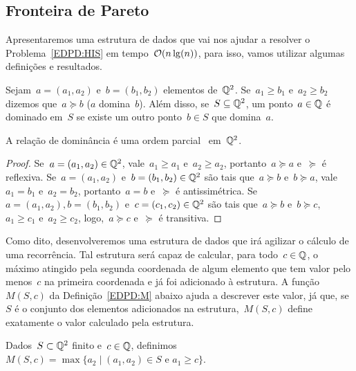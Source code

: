 
\subsection{Fronteira de Pareto}

Apresentaremos uma estrutura de dados que vai nos ajudar a resolver o Problema~\ref{EDPD:HIS} em tempo~$\mathcal{O}(n\lg(n))$, para isso, vamos utilizar algumas definições e resultados.

\begin{defi}
Sejam~${ a = (a_1,a_2) }$ e~${ b = (b_1,b_2) }$ elementos de~$\mathbb{Q}^2$. Se~${ a_1 \geq b_1 }$ e~${ a_2 \geq b_2 }$ dizemos que~${ a \succeq b }$ ($a$ domina~$b$). Além disso, se~${ S \subseteq \mathbb{Q}^2 }$, um ponto~${ a \in \mathbb{Q} }$ é dominado em~$S$ se existe um outro ponto~$b \in S$ que domina~$a$.
\end{defi}

\begin{prop}
A relação de dominância é uma ordem parcial~\cite[Apêndice B]{CLRS} em~$\mathbb{Q}^2$.
\end{prop}
\begin{proof}
Se~$a = (a_1,a_2) \in \mathbb{Q}^2$, vale~$a_1 \geq a_1$ e~$a_2 \geq a_2$, portanto~$a \succeq a$ e~$\succeq$ é reflexiva. Se~$a = (a_1,a_2)$ e~$b = (b_1,b_2) \in \mathbb{Q}^2$ são tais que~$a \succeq b$ e~$b \succeq a$, vale~$a_1 = b_1$ e~$a_2 = b_2$, portanto~$a = b$ e~$\succeq$ é antissimétrica. Se~$a = (a_1,a_2), b = (b_1,b_2)$ e~$c = (c_1,c_2) \in \mathbb{Q}^2$ são tais que~$a \succeq b$ e~$b \succeq c$,~$a_1 \geq c_1$ e~$a_2 \geq c_2$, logo,~$a \succeq c$ e~$\succeq$ é transitiva.
\end{proof}

Como dito, desenvolveremos uma estrutura de dados que irá agilizar o cálculo de uma recorrência. Tal estrutura será capaz de calcular, para todo~${ c \in \mathbb{Q} }$, o máximo atingido pela segunda coordenada de algum elemento que tem valor pelo menos~$c$ na primeira coordenada e já foi adicionado à estrutura. A função~$M(S,c)$ da Definição~\ref{EDPD:M} abaixo ajuda a descrever este valor, já que, se~$S$ é o conjunto dos elementos adicionados na estrutura,~$M(S,c)$ define exatamente o valor calculado pela estrutura.
\begin{defi} \label{EDPD:M}
Dados~$S \subset \mathbb{Q}^2$ finito e~$c \in \mathbb{Q}$, definimos~${M(S,c) = \max\{a_2 \mid (a_1,a_2) \in S \text{ e } a_1 \geq c\}}$.
\end{defi}


